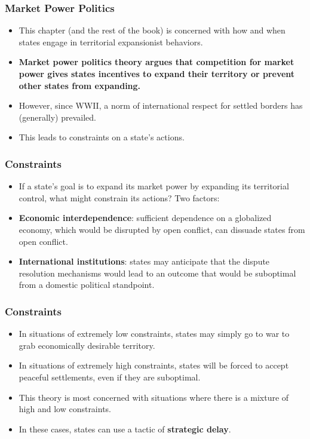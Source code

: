 \documentclass[handout]{beamer}
\begin{document}
\begin{frame} 
	\frametitle{\LARGE{Market Power Politics}}
	\begin{itemize}
		\item This chapter (and the rest of the book) is concerned with how and when states engage in territorial expansionist behaviors. \pause
		\item \textbf{Market power politics theory argues that competition for market power gives states incentives to expand their territory or prevent other states from expanding.}
		\item However, since WWII, a norm of international respect for settled borders has (generally) prevailed. \pause
		\item This leads to constraints on a state's actions. 
	\end{itemize}
\end{frame}

\begin{frame} 
	\frametitle{\LARGE{Constraints}}
	\begin{itemize}
		\item If a state's goal is to expand its market power by expanding its territorial control, what might constrain its actions? Two factors: \pause
		\item \textbf{Economic interdependence}: sufficient dependence on a globalized economy, which would be disrupted by open conflict, can dissuade states from open conflict. \pause
		\item \textbf{International institutions}: states may anticipate that the dispute resolution mechanisms would lead to an outcome that would be suboptimal from a domestic political standpoint.
	\end{itemize}
\end{frame}	

\begin{frame} 
	\frametitle{\LARGE{Constraints}}
	\begin{itemize}
		\item In situations of extremely low constraints, states may simply go to war to grab economically desirable territory. \pause
		\item In situations of extremely high constraints, states will be forced to accept peaceful settlements, even if they are suboptimal. \pause
		\item This theory is most concerned with situations where there is a mixture of high and low constraints. \pause 
		\item In these cases, states can use a tactic of \textbf{strategic delay}.
	\end{itemize}
\end{frame}	
\end{document}
